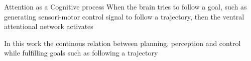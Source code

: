 \begin{frame}[allowframebreaks]{Attention as a Cognitive process}
    When the brain tries to follow a goal, such as generating sensori-motor control signal to follow a trajectory, then the ventral attentional network activates\cite{scalf-2014-trial-history-effects-in-the-ventral-attentional-network}
    
    In this work the continous relation between planning, perception and control while fulfilling goals such as following a trajectory
\end{frame}